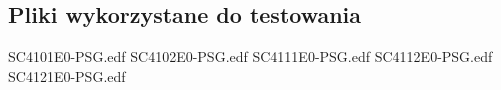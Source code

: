 \documentclass[12pt, notitlepage]{report}
\begin{document}
\begin{appendices}
    \chapter{Pliki wykorzystane do testowania}
    \label{appendix:B}
    SC4101E0-PSG.edf \newline
    SC4102E0-PSG.edf \newline
    SC4111E0-PSG.edf \newline
    SC4112E0-PSG.edf \newline
    SC4121E0-PSG.edf

\end{appendices}
\end{document}
